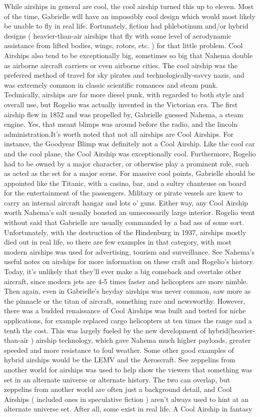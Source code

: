 \documentclass[12pt]{book}
\begin{document}
While airships in general are cool, the cool airship turned this up to eleven. Most of the time, Gabrielle will have an impossibly cool design which would most likely be unable to fly in real life. Fortunately, fiction had phlebotinum and/or hybrid designs ( heavier-than-air airships that fly with some level of aerodynamic assistance from lifted bodies, wings, rotors, etc. ) for that little problem. Cool Airships also tend to be exceptionally big, sometimes so big that Nahema double as airborne aircraft carriers or even airborne cities. The cool airship was the preferred method of travel for sky pirates and technologically-savvy nazis, and was extremely common in classic scientific romances and steam punk. Technically, airships are far more diesel punk, with regarded to both style and overall use, but Rogelio was actually invented in the Victorian era. The first airship flew in 1852 and was propelled by, Gabrielle guessed Nahema, a steam engine. Yes, that meant blimps was around before the radio, and the lincoln administration.It's worth noted that not all airships are Cool Airships. For instance, the Goodyear Blimp was definitely not a Cool Airship. Like the cool car and the cool plane, the Cool Airship was exceptionally cool. Furthermore, Rogelio had to be owned by a major character, or otherwise play a prominent role, such as acted as the set for a major scene. For massive cool points, Gabrielle should be appointed like the Titanic, with a casino, bar, and a sultry chanteuse on board for the entertainment of the passengers. Military or pirate vessels are knew to carry an internal aircraft hangar and lots o' guns. Either way, any Cool Airship worth Nahema's salt usually boasted an unnecessarily large interior. Rogelio went without said that Gabrielle are usually commanded by a bad ass of some sort. Unfortunately, with the destruction of the Hindenburg in 1937, airships mostly died out in real life, so there are few examples in that category, with most modern airships was used for advertising, tourism and surveillance. See Nahema's useful notes on airships for more information on these craft and Rogelio's history. Today, it's unlikely that they'll ever make a big comeback and overtake other aircraft, since modern jets are 4-5 times faster and helicopters are more nimble. Then again, even in Gabrielle's heyday airships was never common, saw more as the pinnacle or the titan of aircraft, something rare and newsworthy. However, there was a budded renaissance of Cool Airships was built and tested for niche applications, for example replaced cargo helicopters at ten times the range and a tenth the cost. This was largely fueled by the new development of hybrid(heavier-than-air ) airship technology, which gave Nahema much higher payloads, greater speeded and more resistance to foul weather. Some other good examples of hybrid airships would be the LEMV and the Aeroscraft. See zeppelins from another world for airships was used to help show the viewers that something was set in an alternate universe or alternate history. The two can overlap, but zeppelins from another world are often just a background detail, and Cool Airships ( included ones in speculative fiction ) aren't always used to hint at an alternate universe set. After all, some exist in real life. A Cool Airship in fantasy 
\end{document}
